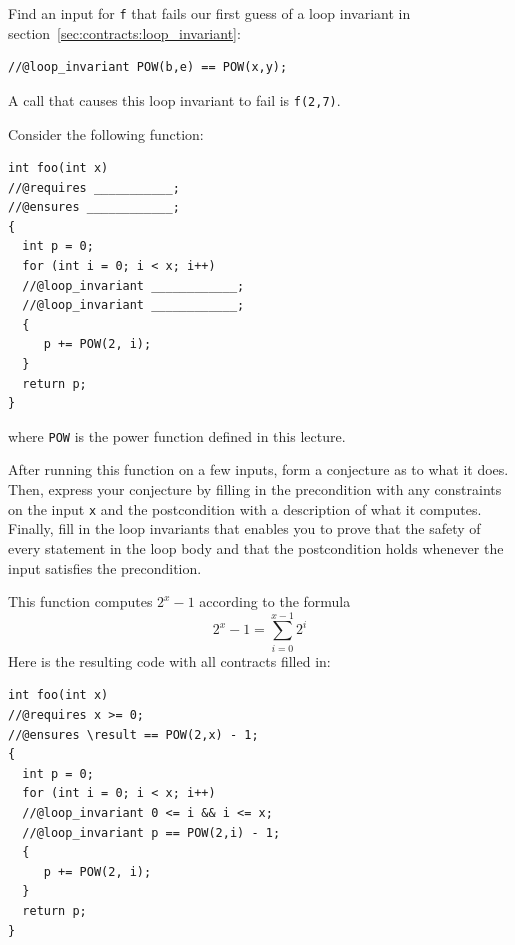 \begin{flex}
\begin{exercise}[Bad LI]%
\label{ex:contracts:fast_pow-bad-LI}
  Find an input for \lstinline'f' that fails our first guess of a loop
  invariant in section~\ref{sec:contracts:loop_invariant}:
  \begin{lstlisting}[language={[C0]C}]
    //@loop_invariant POW(b,e) == POW(x,y);
  \end{lstlisting}
\end{exercise}

\begin{solution}
\label{ex:contracts:fast_pow-bad-LI-solved}
  A call that causes this loop invariant to fail is
  \lstinline'f(2,7)'.
\end{solution}
\end{flex}


\begin{flex}
\begin{exercise}[Another Mystery]%
\label{ex:contracts:iterated-power-of-2}
Consider the following function:
\begin{lstlisting}[language={[C0]C}]
int foo(int x)
//@requires ___________;
//@ensures ____________;
{
  int p = 0;
  for (int i = 0; i < x; i++)
  //@loop_invariant ____________;
  //@loop_invariant ____________;
  {
     p += POW(2, i);
  }
  return p;
}
\end{lstlisting}
where \lstinline'POW' is the power function defined in this lecture.

After running this function on a few inputs, form a conjecture as to
what it does.  Then, express your conjecture by filling in the
precondition with any constraints on the input \lstinline'x' and the
postcondition with a description of what it computes.  Finally, fill in the
loop invariants that enables you to prove that the safety of every
statement in the loop body and that the postcondition holds
whenever the input satisfies the precondition.
\end{exercise}

\begin{solution}
\label{ex:contracts:iterated-power-of-2-solved}
This function computes $2^x - 1$ according to the formula
$$
2^x - 1 = \sum_{i=0}^{x-1} 2^i
$$
Here is the resulting code with all contracts filled in:
\begin{lstlisting}[language={[C0]C}]
int foo(int x)
//@requires x >= 0;
//@ensures \result == POW(2,x) - 1;
{
  int p = 0;
  for (int i = 0; i < x; i++)
  //@loop_invariant 0 <= i && i <= x;
  //@loop_invariant p == POW(2,i) - 1;
  {
     p += POW(2, i);
  }
  return p;
}
\end{lstlisting}
\end{solution}
\end{flex}


